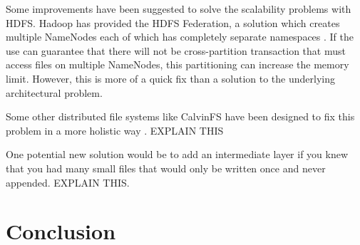 \documentclass[11pt, a4paper]{article}
\begin{document}
\begin{multicols*}{2}
Some improvements have been suggested to solve the scalability problems with HDFS. Hadoop has provided the HDFS Federation, a solution which creates multiple NameNodes each of which has completely separate namespaces \cite{Federation}. If the use can guarantee that there will not be cross-partition transaction that must access files on multiple NameNodes, this partitioning can increase the memory limit. However, this is more of a quick fix than a solution to the underlying architectural problem. 

Some other distributed file systems like CalvinFS have been designed to fix this problem in a more holistic way \cite{CalvinFS}. EXPLAIN THIS 


One potential new solution would be to add an intermediate layer if you knew that you had many small files that would only be written once and never appended. 
EXPLAIN THIS.

\section{Conclusion}



\end{multicols*}
\end{document}
